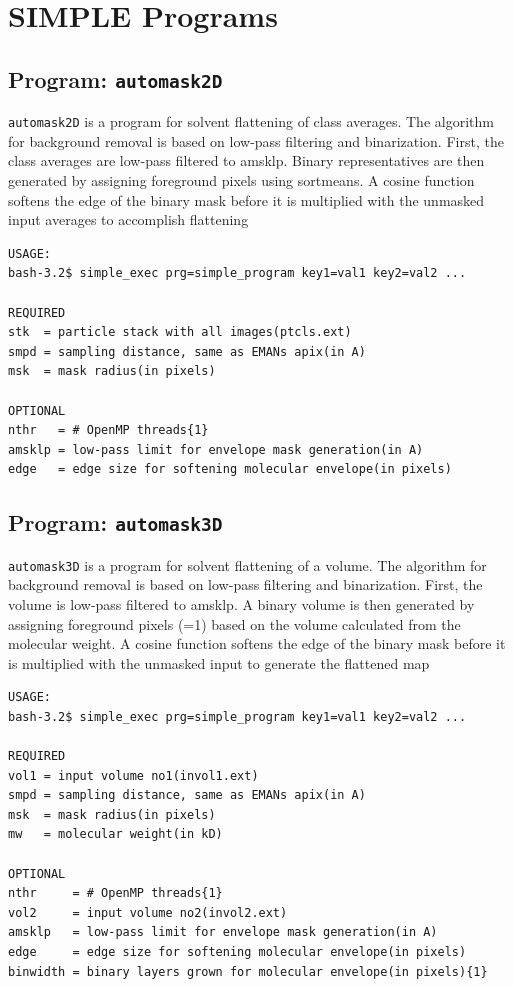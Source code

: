 \documentclass[a4paper,11pt]{article}
\newcommand{\prgname}[1]{\textcolor{NavyBlue}{\texttt{#1}}}
\begin{document}
\begin{tabular}{ll}
\end{tabular}

\section{SIMPLE Programs}
\subsection{Program: \prgname{automask2D}}
\label{automask2D}
\prgname{automask2D} is a program for solvent flattening of class averages. The algorithm for background removal is based on low-pass filtering and binarization. First, the class averages are low-pass filtered to amsklp. Binary representatives are then generated by assigning foreground pixels using sortmeans. A cosine function softens the edge of the binary mask before it is  multiplied with the unmasked input averages to accomplish flattening

\begin{verbatim}
USAGE:
bash-3.2$ simple_exec prg=simple_program key1=val1 key2=val2 ...

REQUIRED
stk  = particle stack with all images(ptcls.ext)
smpd = sampling distance, same as EMANs apix(in A)
msk  = mask radius(in pixels)

OPTIONAL
nthr   = # OpenMP threads{1}
amsklp = low-pass limit for envelope mask generation(in A)
edge   = edge size for softening molecular envelope(in pixels)
\end{verbatim}

\subsection{Program: \prgname{automask3D}}
\label{automask3D}
\prgname{automask3D} is a program for solvent flattening of a volume. The algorithm for background removal is based on low-pass filtering and binarization. First, the volume is low-pass filtered to amsklp. A binary volume is then generated by assigning foreground pixels (=1) based on the volume calculated from the molecular weight. A cosine function softens the edge of the binary mask before it is  multiplied with the unmasked input to generate the flattened map 

\begin{verbatim}
USAGE:
bash-3.2$ simple_exec prg=simple_program key1=val1 key2=val2 ...

REQUIRED
vol1 = input volume no1(invol1.ext)
smpd = sampling distance, same as EMANs apix(in A)
msk  = mask radius(in pixels)
mw   = molecular weight(in kD)

OPTIONAL
nthr     = # OpenMP threads{1}
vol2     = input volume no2(invol2.ext)
amsklp   = low-pass limit for envelope mask generation(in A)
edge     = edge size for softening molecular envelope(in pixels)
binwidth = binary layers grown for molecular envelope(in pixels){1}
\end{verbatim}
\end{document}
